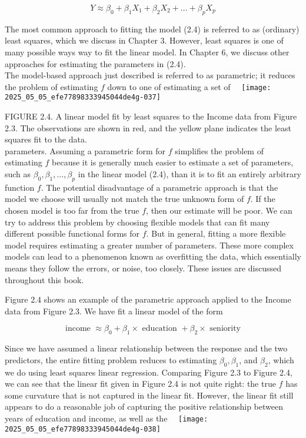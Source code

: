 \documentclass[10pt]{article}
\begin{document}
$$
Y \approx \beta_{0}+\beta_{1} X_{1}+\beta_{2} X_{2}+\ldots+\beta_{p} X_{p}
$$

The most common approach to fitting the model (2.4) is referred to as (ordinary) least squares, which we discuss in Chapter 3. However, least squares is one of many possible ways way to fit the linear model. In Chapter 6, we discuss other approaches for estimating the parameters in (2.4).\\
The model-based approach just described is referred to as parametric; it reduces the problem of estimating $f$ down to one of estimating a set of\
\
\texttt{[image: 2025\_05\_05\_efe77898333945044de4g-037]}

FIGURE 2.4. A linear model fit by least squares to the Income data from Figure 2.3. The observations are shown in red, and the yellow plane indicates the least squares fit to the data.\\
parameters. Assuming a parametric form for $f$ simplifies the problem of estimating $f$ because it is generally much easier to estimate a set of parameters, such as $\beta_{0}, \beta_{1}, \ldots, \beta_{p}$ in the linear model (2.4), than it is to fit an entirely arbitrary function $f$. The potential disadvantage of a parametric approach is that the model we choose will usually not match the true unknown form of $f$. If the chosen model is too far from the true $f$, then our estimate will be poor. We can try to address this problem by choosing flexible models that can fit many different possible functional forms for $f$. But in general, fitting a more flexible model requires estimating a greater number of parameters. These more complex models can lead to a phenomenon known as overfitting the data, which essentially means they follow the errors, or noise, too closely. These issues are discussed throughout this book.

Figure 2.4 shows an example of the parametric approach applied to the Income data from Figure 2.3. We have fit a linear model of the form

$$
\text { income } \approx \beta_{0}+\beta_{1} \times \text { education }+\beta_{2} \times \text { seniority }
$$

Since we have assumed a linear relationship between the response and the two predictors, the entire fitting problem reduces to estimating $\beta_{0}, \beta_{1}$, and $\beta_{2}$, which we do using least squares linear regression. Comparing Figure 2.3 to Figure 2.4, we can see that the linear fit given in Figure 2.4 is not quite right: the true $f$ has some curvature that is not captured in the linear fit. However, the linear fit still appears to do a reasonable job of capturing the positive relationship between years of education and income, as well as the\
\
\texttt{[image: 2025\_05\_05\_efe77898333945044de4g-038]}
\end{document}
